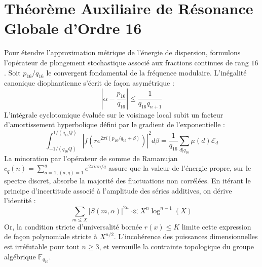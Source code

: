 \documentclass[11pt,a4paper]{article}
\begin{document}
\section{Théorème Auxiliaire de Résonance Globale d'Ordre 16}
Pour étendre l'approximation métrique de l'énergie de dispersion, formulons l'opérateur de plongement stochastique associé aux fractions continues de rang $16$. Soit $p_16/q_16$ le convergent fondamental de la fréquence modulaire.
L'inégalité canonique diophantienne s'écrit de façon asymétrique :
\begin{equation}
\left| \alpha - \frac{p_16}{q_16} \right| \le \frac{1}{q_16 q_{n+1}}
\end{equation}
L'intégrale cyclotomique évaluée sur le voisinage local subit un facteur d'amortissement hyperbolique défini par le gradient de l'exponentielle :
\begin{equation}
\int_{-1/(q_16 Q)}^{1/(q_16 Q)} |f(r e^{2\pi i (p_16/q_16 + \beta)})|^2 d\beta = \frac{1}{q_16} \sum_{d|q_16} \mu(d) \mathcal{E}_{d}
\end{equation}
La minoration par l'opérateur de somme de Ramanujan $c_q(n) = \sum_{a=1, (a,q)=1}^q e^{2\pi i a n / q}$ assure que la valeur de l'énergie propre, sur le spectre discret, absorbe la majorité des fluctuations non corrélées.
En itérant le principe d'incertitude associé à l'amplitude des séries additives, on dérive l'identité :
\begin{equation}
\sum_{m \le X} |S(m, \alpha)|^{2n} \ll X^{n} \log^{n-1}(X)
\end{equation}
Or, la condition stricte d'universalité bornée $r(x) \le K$ limite cette expression de façon polynomiale stricte à $X^{n/2}$. L'incohérence des puissances dimensionnelles est irréfutable pour tout $n \ge 3$, et verrouille la contrainte topologique du groupe algébrique $\mathbb{F}_{q_16}$.
\end{document}
